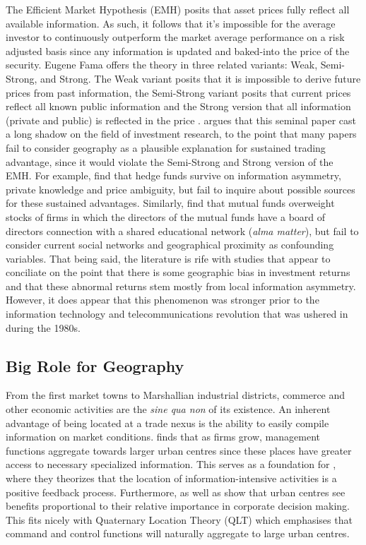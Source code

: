 The Efficient Market Hypothesis (EMH) \citep{Fama1970,Fama1991} posits that asset prices fully reflect all available information.  As such, it follows that it's impossible for the average investor to continuously outperform the market average performance on a risk adjusted basis since any information is updated and baked-into the price of the security. Eugene Fama offers the theory in three related variants: Weak, Semi-Strong, and Strong. The Weak variant posits that it is impossible to derive future prices from past information, the Semi-Strong variant posits that current prices reflect all known public information and the Strong version that all information (private and public) is reflected in the price \citep{Fama1970}.  \cite{Graves2003} argues that this seminal paper cast a long shadow on the field of investment research, to the point that many papers fail to consider geography as a plausible explanation for sustained trading advantage, since it would violate the Semi-Strong and Strong version of the EMH. For example, \cite{Easley2011} find that hedge funds survive on information asymmetry, private knowledge and price ambiguity, but fail to inquire about possible sources for these sustained advantages.  Similarly, \cite{Cohen2008} find that mutual funds overweight stocks of firms in which the directors of the mutual funds have a board of directors connection with a shared educational network (\textit{alma matter}), but fail to consider current social networks and geographical proximity as confounding variables.	
That being said, the literature is rife with studies that appear to conciliate on the point that there is some geographic bias in investment returns and that these abnormal returns stem mostly from local information asymmetry. However, it does appear that this phenomenon was stronger prior to the information technology and telecommunications revolution that was ushered in during the 1980s.  
	
\subsection{Big Role for Geography} 
	
From the first market towns to Marshallian industrial districts, commerce and other economic activities are the \textit{sine qua non} of its existence. An inherent advantage of being located at a trade nexus is the ability to easily compile information on market conditions. \cite{Westaway1974} finds that as firms grow, management functions aggregate towards larger urban centres since these places have greater access to necessary specialized information.  This serves as a foundation for \cite{pred1977}, where they theorizes that the location of information-intensive activities is a positive feedback process. Furthermore, \cite{JAMES1988} as well as \cite{WheelerMitchelson89,Wheeler1989} show that urban centres see benefits proportional to their relative importance in corporate decision making.  This fits nicely with Quaternary Location Theory (QLT)\citep{Semple85} which emphasises that command and control functions will naturally aggregate to large urban centres.
	
